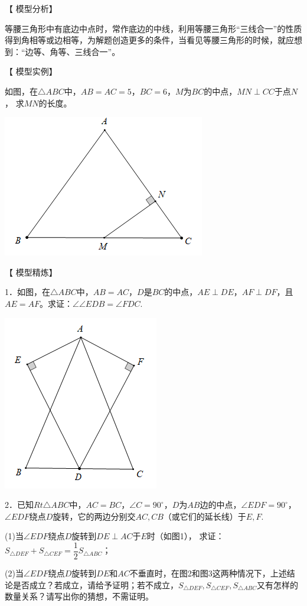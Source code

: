 \documentclass[10pt]{ctexart}
\begin{document}
【 {\heiti 模型分析}】

等腰三角形中有底边中点时，常作底边的中线，利用等腰三角形“三线合一”的性质得到角相等或边相等，为解题创造更多的条件，当看见等腰三角形的时候，就应想到：“边等、角等、三线合一”。

【 {\heiti 模型实例}】

如图，在$\triangle ABC$中，$AB=AC=5$，$BC=6$，$M$为$BC$的中点，$MN\perp CC$于点$N$， 求$MN$的长度。

\begin{flushright}
	\includegraphics[scale=0.6]{figure/zhongdian08}
\end{flushright}

【 {\heiti 模型精炼}】
\begin{shaded}
1．如图，在$\triangle ABC$中，$AB=AC$，$D$是$BC$的中点，$AE\perp DE$，$AF\perp DF$，且$AE=AF$。求证：$∠\angle EDB=\angle FDC$.
\end{shaded}

\begin{flushright}
	\includegraphics[scale=0.6]{figure/zhongdian09}
\end{flushright}

\begin{shaded}
2．已知$Rt\triangle ABC$中，$AC=BC$，$\angle C=90^\circ$，$D$为$AB$边的中点，$\angle EDF=90^\circ$，$\angle EDF$绕点$D$旋转，它的两边分别交$AC,CB$（或它们的延长线）于$E,F$.

(1)当$\angle EDF$绕点$D$旋转到$DE\perp AC$于$E$时（如图1），
求证：$S_{\triangle DEF}+S_{\triangle CEF}=\dfrac{1}{2}S_{\triangle ABC}$；

(2)当$\angle EDF$绕点$D$旋转到$DE$和$AC$不垂直时，在图2和图3这两种情况下，上述结论是否成立？若成立，请给予证明；若不成立，$S_{\triangle DEF},S_{\triangle CEF},S_{\triangle ABC}$又有怎样的数量关系？请写出你的猜想，不需证明。
\end{shaded}
\end{document}
